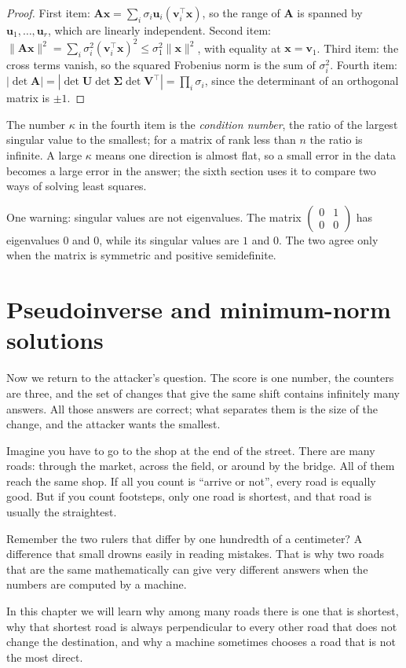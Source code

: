 \begin{proof}
First item: $\mathbf{A}\mathbf{x}=\sum_{i}\sigma_{i}\mathbf{u}_{i}
(\mathbf{v}_{i}^{\top}\mathbf{x})$, so the range of $\mathbf{A}$ is spanned by
$\mathbf{u}_{1},\dots,\mathbf{u}_{r}$, which are linearly independent. Second item:
$\|\mathbf{A}\mathbf{x}\|^{2}=\sum_{i}\sigma_{i}^{2}(\mathbf{v}_{i}^{\top}\mathbf{x})^{2}
\le\sigma_{1}^{2}\|\mathbf{x}\|^{2}$, with equality at $\mathbf{x}=\mathbf{v}_{1}$.
Third item: the cross terms vanish, so the squared Frobenius norm is the sum of
$\sigma_{i}^{2}$. Fourth item: $|\det\mathbf{A}|=|\det\mathbf{U}\det\boldsymbol{\Sigma}
\det\mathbf{V}^{\top}|=\prod_{i}\sigma_{i}$, since the determinant of an orthogonal matrix is $\pm1$.
\end{proof}

The number $\kappa$ in the fourth item is the \emph{condition number}, the ratio of the largest
singular value to the smallest; for a matrix of rank less than $n$ the ratio is infinite.
A large $\kappa$ means one direction is almost flat, so a small error in the data becomes a
large error in the answer; the sixth section uses it to compare two ways of
solving least squares.

One warning: singular values are not eigenvalues. The matrix
$\begin{pmatrix}0&1\\0&0\end{pmatrix}$ has eigenvalues $0$ and $0$, while its singular
values are $1$ and $0$. The two agree only when the matrix is symmetric and positive
semidefinite.

\section{Pseudoinverse and minimum-norm solutions}

Now we return to the attacker's question. The score is one number, the counters are three,
and the set of changes that give the same shift contains infinitely many answers. All those
answers are correct; what separates them is the size of the change, and the attacker wants
the smallest.

\begin{untukanak}
Imagine you have to go to the shop at the end of the street. There are many roads: through the
market, across the field, or around by the bridge. All of them reach the same shop. If all
you count is ``arrive or not'', every road is equally good. But if you count
footsteps, only one road is shortest, and that road is usually the
straightest.

Remember the two rulers that differ by one hundredth of a centimeter? A difference that small
drowns easily in reading mistakes. That is why two roads that are the same mathematically can
give very different answers when the numbers are computed by a machine.

In this chapter we will learn why among many roads there is one that is shortest, why that
shortest road is always perpendicular to every other road that does not change the
destination, and why a machine sometimes chooses a road that is not the most direct.
\end{untukanak}

